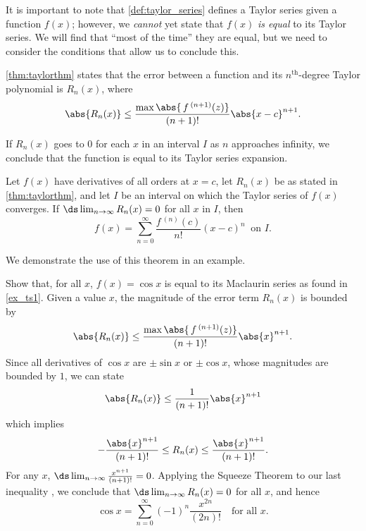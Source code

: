 It is important to note that \autoref{def:taylor_series} defines a Taylor series given a function $f(x)$; however, we \emph{cannot} yet state that $f(x)$ \emph{is equal} to its Taylor series. We will find that ``most of the time'' they are equal, but we need to consider the conditions that allow us to conclude this.

\autoref{thm:taylorthm} states that the error between a function and its $n^\text{th}$-degree Taylor polynomial is $R_n(x)$, where
\[\abs{R_n(x)}\leq \frac{\max\abs{\,f\,^{(n+1)}(z)}}{(n+1)!}\abs{x-c}^{n+1}.\]

If $R_n(x)$ goes to 0 for each $x$ in an interval $I$ as $n$ approaches infinity, we conclude that the function is equal to its Taylor series expansion.

\begin{theorem}\label{thm:function_series_equality}
Let $f(x)$ have derivatives of all orders at $x=c$, let $R_n(x)$ be as stated in \autoref{thm:taylorthm}, and let $I$ be an interval on which the Taylor series of $f(x)$ converges. 
If $\ds\lim_{n\to\infty} R_n(x) = 0$ for all $x$ in $I$, then 
\[f(x) = \sum_{n=0}^\infty \frac{f\,^{(n)}(c)}{n!}(x-c)^n\ \text{ on $I$.}\]
\end{theorem}

We demonstrate the use of this theorem in an example.

\begin{example}\label{ex_ts3}
Show that, for all $x$, $f(x) = \cos x$ is equal to its Maclaurin series as found in \autoref{ex_ts1}.
\solution
Given a value $x$, the magnitude of the error term $R_n(x)$ is bounded by
\[\abs{R_n(x)}\leq \frac{\max\abs{\,f\,^{(n+1)}(z)}}{(n+1)!}\abs{x}^{n+1}.\]
Since all derivatives of $\cos x$ are $\pm \sin x$ or $\pm\cos x$, whose magnitudes are bounded by $1$, we can state
\[\abs{R_n(x)}\leq \frac{1}{(n+1)!}\abs{x}^{n+1}\]
which implies
\begin{equation*}
 -\frac{\abs{x}^{n+1}}{(n+1)!} \leq R_n(x) \leq\frac{\abs{x}^{n+1}}{(n+1)!}.%
\end{equation*}
For any $x$, $\ds\lim_{n\to\infty} \frac{x^{n+1}}{(n+1)!} = 0$. Applying the Squeeze Theorem to our last inequality%
, we conclude that $\ds \lim_{n\to\infty} R_n(x) = 0$ for all $x$, and hence
\[\cos x = \sum_{n=0}^\infty (-1)^{n}\frac{x^{2n}}{(2n)!}\quad \text{for all $x$}.\]
\end{example}

